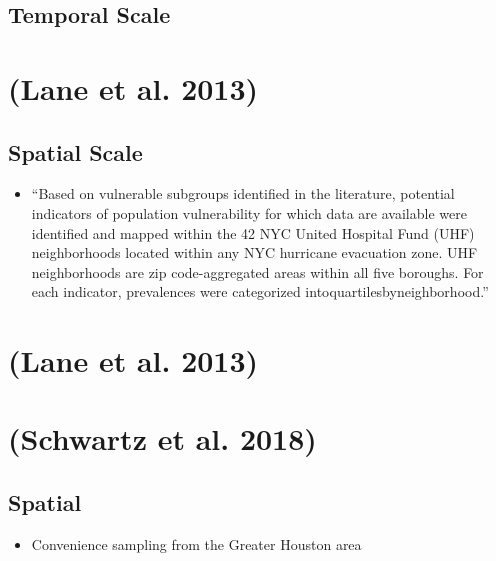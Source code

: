 \documentclass[
]{article}
\providecommand{\tightlist}{%
  \setlength{\itemsep}{0pt}\setlength{\parskip}{0pt}}
\begin{document}
\hypertarget{temporal-scale-3}{%
\subsection{Temporal Scale}\label{temporal-scale-3}}

\hypertarget{lane2013health}{%
\section{(Lane et al. 2013)}\label{lane2013health}}

\hypertarget{spatial-scale-6}{%
\subsection{Spatial Scale}\label{spatial-scale-6}}

\begin{itemize}
\tightlist
\item
  ``Based on vulnerable subgroups identified in the literature,
  potential indicators of population vulnerability for which data are
  available were identified and mapped within the 42 NYC United Hospital
  Fund (UHF) neighborhoods located within any NYC hurricane evacuation
  zone. UHF neighborhoods are zip code-aggregated areas within all five
  boroughs. For each indicator, prevalences were categorized
  intoquartilesbyneighborhood.''
\end{itemize}

\hypertarget{lane2013health-1}{%
\section{(Lane et al. 2013)}\label{lane2013health-1}}

\hypertarget{schwartz2018preliminary}{%
\section{(Schwartz et al. 2018)}\label{schwartz2018preliminary}}

\hypertarget{spatial}{%
\subsection{Spatial}\label{spatial}}

\begin{itemize}
\tightlist
\item
  Convenience sampling from the Greater Houston area
\end{itemize}
\end{document}
